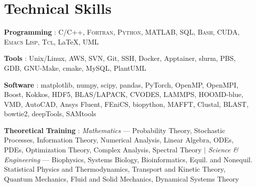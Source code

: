 \documentclass[letterpaper,10pt]{article}
\newcommand{\sectionspace}{
\vspace{-17pt}
}
\newcommand{\subheadingtitlevspace}{
\vspace{-3pt}
}
\newcommand{\titleItem}[1]{
  \textbf{#1}
}
\begin{document}
 \section{\textcolor{color1}{Technical Skills}}
 \subheadingtitlevspace
 \begin{itemize}[leftmargin=0.15in, label={}]
   {\item{
       \vspace{1pt}
       \titleItem{Programming}{: \textsc{C/C++, Fortran, Python, MATLAB, SQL, Bash, CUDA, Emacs Lisp, Tcl}, \LaTeX, \textsc{UML}}\\
       \vspace{1pt}
       \titleItem{Tools}{: Unix/Linux, AWS, SVN, Git, SSH, Docker, Apptainer, slurm, PBS, GDB, GNU-Make, cmake, MySQL, PlantUML}\\
       \vspace{1pt}
       \titleItem{Software}{: matplotlib, numpy, scipy, pandas, PyTorch, OpenMP, OpenMPI, Boost, Kokkos, HDF5, BLAS/LAPACK, CVODES, LAMMPS, HOOMD-blue, VMD, AutoCAD, Ansys Fluent, FEniCS, biopython, MAFFT, Clustal, BLAST, bowtie2, deepTools, SAMtools} \\
       \vspace{1pt}
       \titleItem{Theoretical Training}{: \emph{Mathematics} --- Probability Theory, Stochastic Processes, Information Theory, Numerical Analysis, Linear Algebra, ODEs, PDEs, Optimization Theory, Complex Analysis, Spectral Theory $|$ \emph{Science \& Engineering} --- Biophysics, Systems Biology, Bioinformatics, Equil. and Nonequil. Statistical Physics and Thermodynamics, Transport and Kinetic Theory, Quantum Mechanics, Fluid and Solid Mechanics, Dynamical Systems Theory}
     }}
 \end{itemize}
 \sectionspace
\end{document}
